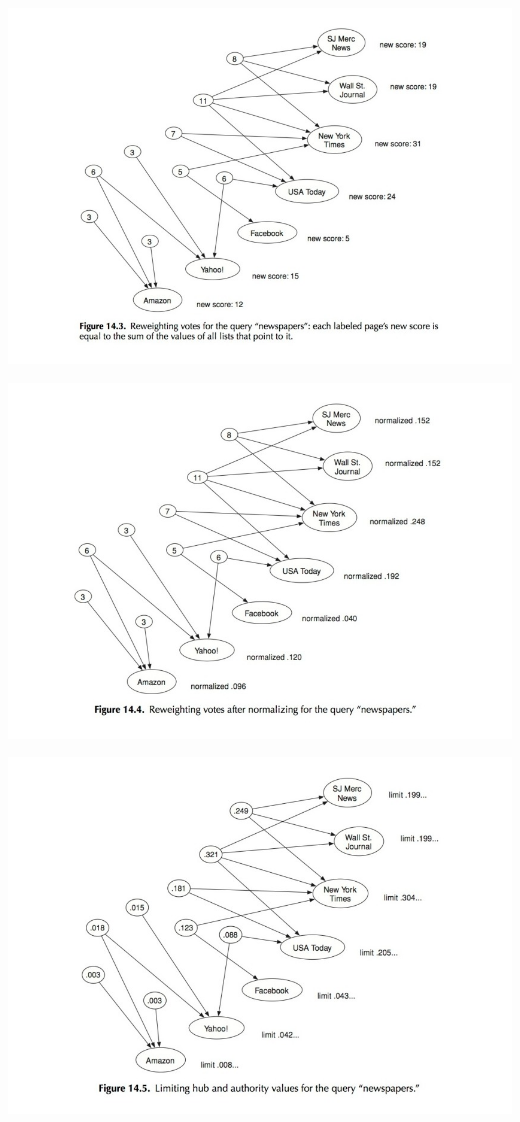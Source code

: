  \includegraphics[scale=0.5]{images/ref/fig-14-3.jpeg}
 
 \includegraphics[scale=0.5]{images/ref/fig-14-4.jpeg}
 
 \includegraphics[scale=0.5]{images/ref/fig-14-5.jpeg}
	
